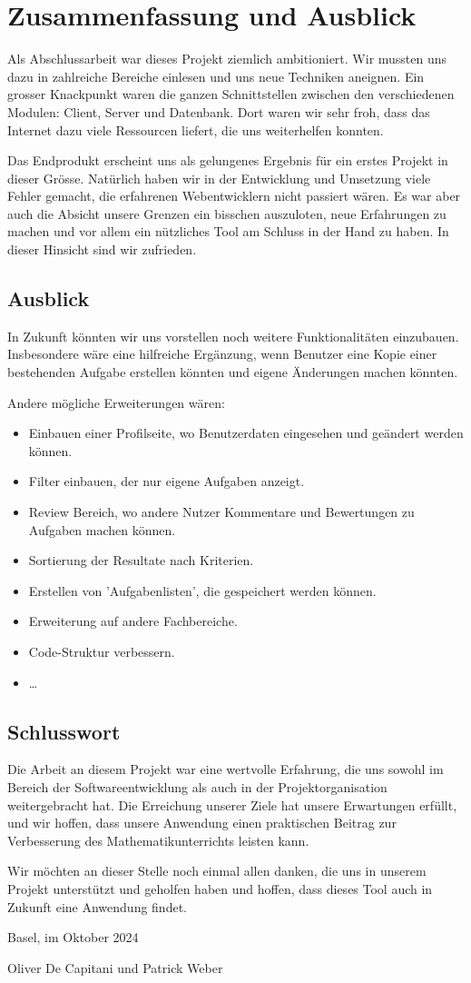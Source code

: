 \section{Zusammenfassung und Ausblick}
Als Abschlussarbeit war dieses Projekt ziemlich ambitioniert. Wir mussten uns dazu in zahlreiche Bereiche einlesen und uns neue Techniken aneignen. Ein grosser Knackpunkt waren die ganzen Schnittstellen zwischen den verschiedenen Modulen: Client, Server und Datenbank. Dort waren wir sehr froh, dass das Internet dazu viele Ressourcen liefert, die uns weiterhelfen konnten. 

Das Endprodukt erscheint uns als gelungenes Ergebnis für ein erstes Projekt in dieser Grösse. Natürlich haben wir in der Entwicklung und Umsetzung viele Fehler gemacht, die erfahrenen Webentwicklern nicht passiert wären. Es war aber auch die Absicht unsere Grenzen ein bisschen auszuloten, neue Erfahrungen zu machen und vor allem ein nützliches Tool am Schluss in der Hand zu haben. In dieser Hinsicht sind wir zufrieden.


\subsection{Ausblick}
In Zukunft könnten wir uns vorstellen noch weitere Funktionalitäten einzubauen. Insbesondere wäre eine hilfreiche Ergänzung, wenn Benutzer eine Kopie einer bestehenden Aufgabe erstellen könnten und eigene Änderungen machen könnten.

Andere mögliche Erweiterungen wären:
\begin{itemize}
    \item Einbauen einer Profilseite, wo Benutzerdaten eingesehen und geändert werden können. 
    \item Filter einbauen, der nur eigene Aufgaben anzeigt.
    \item Review Bereich, wo andere Nutzer Kommentare und Bewertungen zu Aufgaben machen können.
    \item Sortierung der Resultate nach Kriterien.
    \item Erstellen von 'Aufgabenlisten', die gespeichert werden können.
    \item Erweiterung auf andere Fachbereiche.
    \item Code-Struktur verbessern.
    \item \ldots
\end{itemize}


\subsection{Schlusswort}
Die Arbeit an diesem Projekt war eine wertvolle Erfahrung, die uns sowohl im Bereich der Softwareentwicklung als auch in der Projektorganisation weitergebracht hat. Die Erreichung unserer Ziele hat unsere Erwartungen erfüllt, und wir hoffen, dass unsere Anwendung einen praktischen Beitrag zur Verbesserung des Mathematikunterrichts leisten kann.

Wir möchten an dieser Stelle noch einmal allen danken, die uns in unserem Projekt unterstützt und geholfen haben und hoffen, dass dieses Tool auch in Zukunft eine Anwendung findet.


\begin{flushright}
    Basel, im Oktober 2024
    
    Oliver De Capitani und Patrick Weber
\end{flushright}